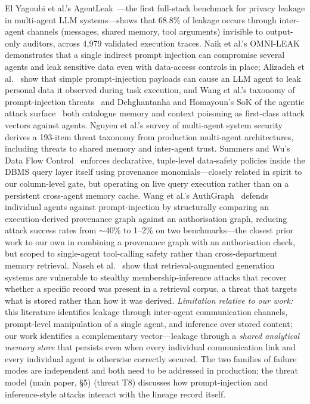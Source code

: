 \documentclass[9pt,twocolumn,twoside]{extarticle}
\begin{document}
El Yagoubi et al.'s AgentLeak~\cite{elyagoubi2026agentleak}---the first
full-stack benchmark for privacy leakage in multi-agent LLM systems---shows
that 68.8\% of leakage occurs through inter-agent channels (messages, shared
memory, tool arguments) invisible to output-only auditors, across 4,979
validated execution traces.
Naik et al.'s OMNI-LEAK~\cite{naik2026omnileak} demonstrates that a single
indirect prompt injection can compromise several agents and leak sensitive
data even with data-access controls in place; Alizadeh et
al.~\cite{alizadeh2025leak} show that simple prompt-injection payloads can
cause an LLM agent to leak personal data it observed during task execution,
and Wang et al.'s taxonomy of prompt-injection
threats~\cite{wang2026landscape} and Dehghantanha and Homayoun's SoK of the
agentic attack surface~\cite{dehghantanha2026sok} both catalogue memory and
context poisoning as first-class attack vectors against agents.
Nguyen et al.'s survey of multi-agent system security~\cite{nguyen2026security}
derives a 193-item threat taxonomy from production multi-agent architectures,
including threats to shared memory and inter-agent trust.
Summers and Wu's Data Flow Control~\cite{summers2026dataflow} enforces
declarative, tuple-level data-safety policies inside the DBMS query layer
itself using provenance monomials---closely related in spirit to our
column-level gate, but operating on live query execution rather than on a
persistent cross-agent memory cache.
Wang et al.'s AuthGraph~\cite{wang2026authgraph} defends individual agents
against prompt-injection by structurally comparing an execution-derived
provenance graph against an authorisation graph, reducing attack success rates
from $\sim$40\% to 1--2\% on two benchmarks---the closest prior work to our
own in combining a provenance graph with an authorisation check, but scoped to
single-agent tool-calling safety rather than cross-department memory
retrieval.
Naseh et al.~\cite{naseh2025riddle} show that retrieval-augmented generation
systems are vulnerable to stealthy membership-inference attacks that recover
whether a specific record was present in a retrieval corpus, a threat that
targets what is stored rather than how it was derived.
\emph{Limitation relative to our work:} this literature identifies leakage
through inter-agent communication channels, prompt-level manipulation of a
single agent, and inference over stored content; our work identifies a
complementary vector---leakage through a \emph{shared analytical memory
store} that persists even when every individual communication link and every
individual agent is otherwise correctly secured.
The two families of failure modes are independent and both need to be
addressed in production; the threat model (main paper, \S5) (threat T8) discusses how
prompt-injection and inference-style attacks interact with the lineage record
itself.
\end{document}
